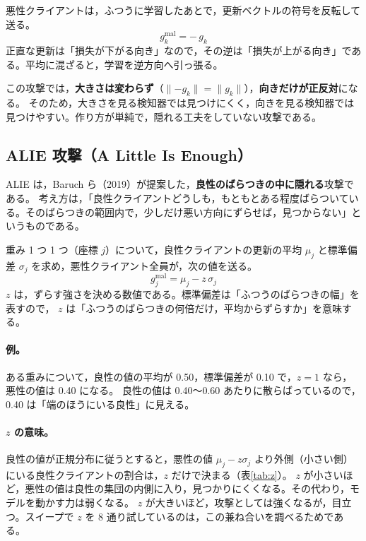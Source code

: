 \documentclass[a4j, dvipdfmx]{jsarticle}  %
\begin{document}
悪性クライアントは，ふつうに学習したあとで，更新ベクトルの符号を反転して送る。
\begin{equation}
  g_k^{\mathrm{mal}} = -\,g_k
\end{equation}
正直な更新は「損失が下がる向き」なので，その逆は「損失が上がる向き」である。平均に混ざると，学習を逆方向へ引っ張る。

この攻撃では，\textbf{大きさは変わらず}（$\|{-g_k}\| = \|g_k\|$），\textbf{向きだけが正反対}になる。
そのため，大きさを見る検知器では見つけにくく，向きを見る検知器では見つけやすい。作り方が単純で，隠れる工夫をしていない攻撃である。

\subsection{ALIE 攻撃（A Little Is Enough）}
\label{sec:alie}

ALIE は，Baruch ら（2019）が提案した，\textbf{良性のばらつきの中に隠れる}攻撃である。
考え方は，「良性クライアントどうしも，もともとある程度ばらついている。そのばらつきの範囲内で，少しだけ悪い方向にずらせば，見つからない」というものである。

重み 1 つ 1 つ（座標 $j$）について，良性クライアントの更新の平均 $\mu_j$ と標準偏差 $\sigma_j$ を求め，悪性クライアント全員が，次の値を送る。
\begin{equation}
  g_j^{\mathrm{mal}} = \mu_j - z\,\sigma_j
  \label{eq:alie}
\end{equation}
$z$ は，ずらす強さを決める数値である。標準偏差は「ふつうのばらつきの幅」を表すので，
$z$ は「ふつうのばらつきの何倍だけ，平均からずらすか」を意味する。

\paragraph{例。}
ある重みについて，良性の値の平均が 0.50，標準偏差が 0.10 で，$z = 1$ なら，悪性の値は 0.40 になる。
良性の値は 0.40〜0.60 あたりに散らばっているので，0.40 は「端のほうにいる良性」に見える。

\paragraph{$z$ の意味。}
良性の値が正規分布に従うとすると，悪性の値 $\mu_j - z\sigma_j$ より外側（小さい側）にいる良性クライアントの割合は，$z$ だけで決まる（表\ref{tab:z}）。
$z$ が小さいほど，悪性の値は良性の集団の内側に入り，見つかりにくくなる。その代わり，モデルを動かす力は弱くなる。
$z$ が大きいほど，攻撃としては強くなるが，目立つ。スイープで $z$ を 8 通り試しているのは，この兼ね合いを調べるためである。
\end{document}
